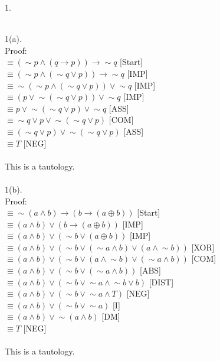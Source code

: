 \documentclass[a4paper, 20pt]{article}
\def\lnot{\mathop{\sim}}
\begin{document}
\newpage
\begin{question}{1.}

\newpage
\\ 1(a).
\\ Proof:
\\ $ \equiv (\lnot p \land (q \rightarrow p)) \rightarrow \lnot q$ [Start]
\\ $ \equiv (\lnot p \land (\lnot q \lor p)) \rightarrow \lnot q$ [IMP]
\\ $ \equiv \lnot (\lnot p \land (\lnot q \lor p)) \lor \lnot q$ [IMP]
\\ $ \equiv ( p \lor \lnot (\lnot q \lor p)) \lor \lnot q$ [IMP]
\\ $ \equiv p \lor \lnot (\lnot q \lor p) \lor \lnot q$ [ASS]
\\ $ \equiv \lnot q \lor p \lor \lnot (\lnot q \lor p) $ [COM]
\\ $ \equiv (\lnot q \lor p) \lor \lnot (\lnot q \lor p) $ [ASS]
\\ $ \equiv T $ [NEG]
\\ \boxed{}
\\ This is a tautology.
\\
\\1(b).
\\Proof:
\\ $\equiv \lnot(a \land b) \rightarrow (b \rightarrow (a \oplus b))$ [Start]
\\ $\equiv (a \land b) \lor (b \rightarrow (a \oplus b))$ [IMP]
\\ $\equiv (a \land b) \lor (\lnot b \lor (a \oplus b))$ [IMP]
\\ $\equiv (a \land b) \lor (\lnot b \lor (\lnot a \land b) \lor (a \land \lnot b))$  [XOR]
\\ $\equiv (a \land b) \lor (\lnot b \lor (a \land \lnot b) \lor (\lnot a \land b))$  [COM]
\\ $\equiv (a \land b) \lor (\lnot b \lor (\lnot a \land b))$  [ABS]
\\ $\equiv (a \land b) \lor (\lnot b \lor \lnot a \land \lnot b \lor b)$ [DIST]
\\ $\equiv (a \land b) \lor (\lnot b \lor \lnot a \land T)$  [NEG]
\\ $\equiv (a \land b) \lor (\lnot b \lor \lnot a)$  [I]
\\ $\equiv (a \land b) \lor \lnot  (a \land b)$  [DM]
\\ $\equiv T$  [NEG]
\\\boxed{}
\\ This is a tautology.
\\

\end{question}
\end{document}
